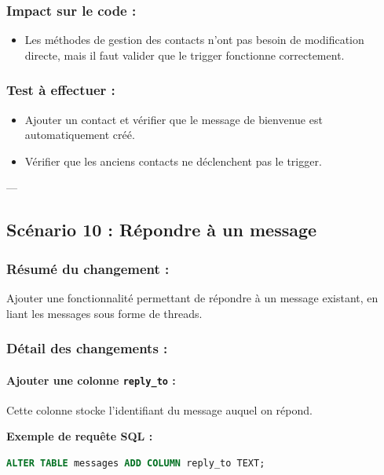 \documentclass[a4paper,11pt]{article}
\begin{document}
\subsubsection*{Impact sur le code :}
\begin{itemize}
    \item Les méthodes de gestion des contacts n'ont pas besoin de modification directe, mais il faut valider que le trigger fonctionne correctement.
\end{itemize}

\subsubsection*{Test à effectuer :}
\begin{itemize}
    \item Ajouter un contact et vérifier que le message de bienvenue est automatiquement créé.
    \item Vérifier que les anciens contacts ne déclenchent pas le trigger.
\end{itemize}

---

\subsection*{Scénario 10 : Répondre à un message}

\subsubsection*{Résumé du changement :}
Ajouter une fonctionnalité permettant de répondre à un message existant, en liant les messages sous forme de threads.

\subsubsection*{Détail des changements :}

\paragraph{Ajouter une colonne \texttt{reply\_to} :}
Cette colonne stocke l'identifiant du message auquel on répond.

\textbf{Exemple de requête SQL :}
\begin{lstlisting}[language=SQL]
ALTER TABLE messages ADD COLUMN reply_to TEXT;
\end{lstlisting}
\end{document}
